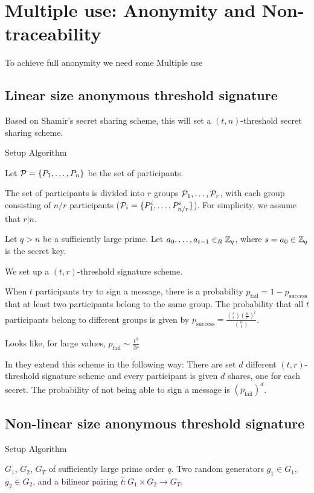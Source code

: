 \chapter{Multiple use: Anonymity and Non-traceability}
To achieve full anonymity we need some 
Multiple use 


\section{Linear size anonymous threshold signature}
\cite{DazaDSV09}

Based on Shamir's secret sharing scheme, this will set a $(t,n)$-threshold secret sharing scheme.

Setup Algorithm

Let ${\mathcal P} = \{P_1 , \dots , P_n \}$ be the set of participants.

The set of participants is divided into $r$ groups ${\mathcal P}_1, \dots , {\mathcal P}_r$, with each group consisting of $n/r$ participants (${\mathcal P}_i = \{P^i_1, \dots , P^i_{n/r}\}$). For simplicity, we assume that $r \vert n$.

Let $q > n$ be a sufficiently large prime. Let $a_0, \dots , a_{t-1} \in_R {\mathbb Z}_q$, where $s=a_0 \in {\mathbb Z}_q$ is the secret key.

We set up a $(t,r)$-threshold signature scheme.

When $t$ participants try to sign a message, there is a probability $p_{\text{fail}} = 1 - p_{\text{success}}$ that at least two participants belong to the same group. The probability that all $t$ participants belong to different groups is given by $p_{\text{success}} = \frac{\binom{r}{t} \left( \frac{n}{r} \right)^{t}}{\binom{n}{t}}$.

Looks like, for large values, $p_{\text{fail}} \sim \frac{t^2}{2r}$

In \cite{DazaDSV09} they extend this scheme in the following way: There are set $d$ different $(t,r)$-threshold signature scheme and every participant is given $d$ shares, one for each secret. The probability of not being able to sign a message is $\left(p_{\text{fail}} \right)^d$.

\section{Non-linear size anonymous threshold signature}
\cite{ChenNW11}
Setup Algorithm

$G_1$, $G_2$, $G_T$ of sufficiently large prime order $q$. Two random generators $g_1 \in G_1$, $g_2 \in G_2$, and a bilinear pairing $\hat{t}: G_1 \times G_2 \rightarrow G_T$.

